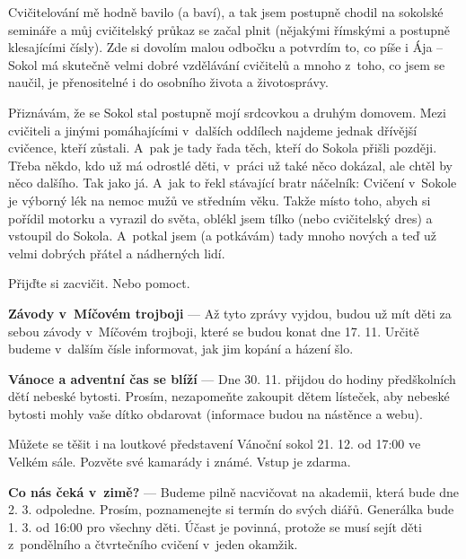 \documentclass[11pt]{article}
\begin{document}
Cvičitelování mě hodně bavilo (a baví), a tak jsem postupně chodil na sokolské semináře a můj cvičitelský průkaz se začal plnit (nějakými římskými a postupně klesajícími čísly). Zde si dovolím malou odbočku a potvrdím to, co píše i Ája – Sokol má skutečně velmi dobré vzdělávání cvičitelů a mnoho z~toho, co jsem se naučil, je přenositelné i do osobního života a životosprávy.

Přiznávám, že se Sokol stal postupně mojí \luv{}srdcovkou\ruv{} a druhým domovem. Mezi cvičiteli a jinými pomáhajícími v~dalších oddílech najdeme jednak dřívější cvičence, kteří zůstali. A~pak je tady řada těch, kteří do Sokola přišli později. Třeba někdo, kdo už má odrostlé děti, v~práci už také něco dokázal, ale chtěl by něco dalšího. Tak jako já. A~jak to řekl stávající bratr náčelník: \luv{}Cvičení v~Sokole je výborný lék na nemoc mužů ve středním věku.\ruv{} Takže místo toho, abych si pořídil motorku a vyrazil do světa, oblékl jsem tílko (nebo cvičitelský dres) a vstoupil do Sokola. A~potkal jsem (a potkávám) tady mnoho nových a teď už velmi dobrých přátel a nádherných lidí.

Přijďte si zacvičit. Nebo pomoct.

\signature{br. Tomáš Dragoun}{}

\vspace*{24pt}



\vspace*{12pt}
\noindent
\textbf{Závody v~Míčovém trojboji} --- Až tyto zprávy vyjdou, budou už mít děti za sebou závody v~Míčovém trojboji, které se budou konat dne 17. 11. Určitě budeme v~dalším čísle informovat, jak jim kopání a házení šlo.

\vspace*{12pt}
\noindent
\textbf{Vánoce a adventní čas se blíží} --- Dne 30. 11. přijdou do hodiny předškolních dětí nebeské bytosti. Prosím, nezapomeňte zakoupit dětem lísteček, aby nebeské bytosti mohly vaše dítko obdarovat (informace budou na nástěnce a webu).

Můžete se těšit i na  loutkové představení Vánoční sokol 21. 12. od 17:00 ve Velkém sále. Pozvěte své kamarády i známé. Vstup je zdarma.				

\vspace*{12pt}
\noindent
\textbf{Co nás čeká v~zimě?} --- Budeme pilně nacvičovat na akademii, která bude dne 2. 3. odpoledne. Prosím, poznamenejte si termín do svých diářů. Generálka bude 1. 3. od 16:00 pro všechny děti. Účast je povinná, protože se musí sejít děti z~pondělního a čtvrtečního cvičení v~jeden okamžik.
\end{document}
